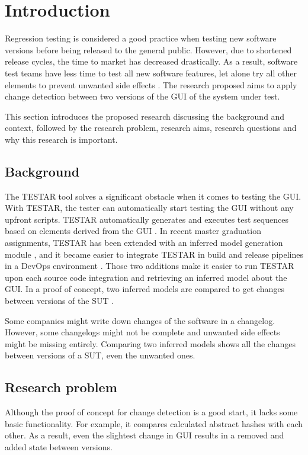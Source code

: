 \section{Introduction} \label{intoduction}

Regression testing is considered a good practice when testing new software versions before being released to the general public. 
However, due to shortened release cycles, the time to market has decreased drastically. As a result, software test teams have less time to test all new software features, let alone try all other elements to prevent unwanted side effects \cite{rapid-release-cycle-issues}.
The research proposed aims to apply change detection between two versions of the GUI of the system under test. 

This section introduces the proposed research discussing the background and context, followed by the research problem, research aims, research questions and why this research is important.

\subsection{Background}
The TESTAR tool solves a significant obstacle when it comes to testing the GUI. With TESTAR, the tester can automatically start testing the GUI without any upfront scripts. TESTAR automatically generates and executes test sequences based on elements derived from the GUI \cite{VosAho2021}. In recent master graduation assignments, TESTAR has been extended with an inferred model generation module \cite{thesisMulders}, and it became easier to integrate TESTAR in build and release pipelines in a DevOps environment \cite{thesisSlomp}. Those two additions make it easier to run TESTAR upon each source code integration and retrieving an inferred model about the GUI. In a proof of concept, two inferred models are compared to get changes between versions of the SUT \cite{stateDiff}.

Some companies might write down changes of the software in a changelog. However, some changelogs might not be complete and unwanted side effects might be missing entirely. Comparing two inferred models shows all the changes between versions of a SUT, even the unwanted ones.

\subsection{Research problem}
Although the proof of concept for change detection is a good start, it lacks some basic functionality. For example, it compares calculated abstract hashes with each other. As a result, even the slightest change in GUI results in a removed and added state between versions.

